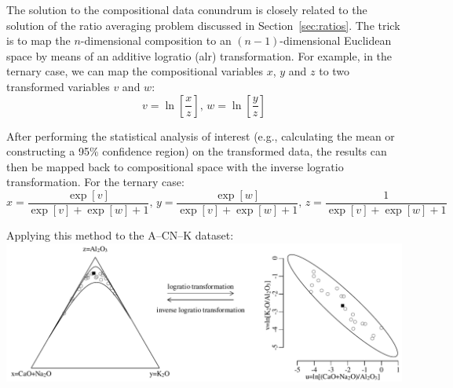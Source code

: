 The solution to the compositional data conundrum is closely related to
the solution of the ratio averaging problem discussed in
Section~\ref{sec:ratios}. The trick is to map the $n$-dimensional
composition to an $(n-1)$-dimensional Euclidean space by means of an
additive logratio (alr) transformation. For example, in the ternary
case, we can map the compositional variables $x$, $y$ and $z$ to two
transformed variables $v$ and $w$:
\begin{equation}
  v = \ln\!\left[\frac{x}{z}\right] \mbox{,~} w =
  \ln\!\left[\frac{y}{z}\right]
  \label{eq:alr}
\end{equation}

After performing the statistical analysis of interest (e.g.,
calculating the mean or constructing a 95\% confidence region) on the
transformed data, the results can then be mapped back to compositional
space with the inverse logratio transformation. For the ternary case:
\begin{equation}
  x = \frac{\exp[v]}{\exp[v] + \exp[w] + 1} \mbox{,~}
  y = \frac{\exp[w]}{\exp[v] + \exp[w] + 1} \mbox{,~}
  z = \frac{1}{\exp[v] + \exp[w] + 1}
  \label{eq:inverse-logratio-transformation}
\end{equation}

Applying this method to the A--CN--K dataset:\\

\noindent\includegraphics[width=\linewidth]{../figures/alr.PDF}
\begingroup {}
\label{fig:alr}\endgroup

